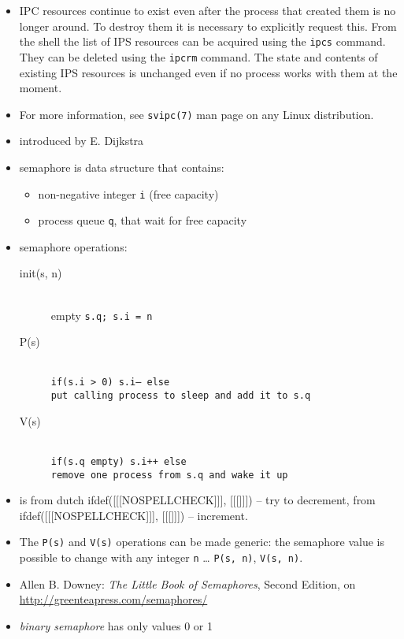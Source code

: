 \begin{itemize}
\item IPC resources continue to exist even after the process that created them
is no longer around. To destroy them it is necessary to explicitly request this.
From the shell the list of IPS resources can be acquired using
the \texttt{ipcs} command. They can be deleted using the \texttt{ipcrm} command.
The state and contents of existing IPS resources is unchanged even if no process
works with them at the moment.
\item For more information, see \texttt{svipc(7)} man page on any Linux
distribution.
\end{itemize}


\begin{slide}
\begin{itemize}
\item introduced by E. Dijkstra
\item semaphore is data structure that contains:
    \begin{itemize}
    \item non-negative integer \texttt{i} (free capacity)
    \item process queue \texttt{q}, that wait for free capacity
    \end{itemize}
\item semaphore operations:
    \begin{description}
    \item [init(s, n)]~\\
    empty \texttt{s.q; s.i = n}
    \item [P(s)]~\\
    \texttt{if(s.i > 0) s.i-- else\\
    put calling process to sleep and add it to s.q }
    \item [V(s)]~\\
    \texttt{if(s.q empty) s.i++ else\\
    remove one process from s.q and wake it up}
    \end{description}
\end{itemize}
\end{slide}

\begin{itemize}
\item {} is from dutch ifdef([[[NOSPELLCHECK]]],
[[[]]]) -- try to
decrement,  from ifdef([[[NOSPELLCHECK]]], [[[]]])
-- increment.
\item The \texttt{P(s)} and \texttt{V(s)} operations can be made generic:
the semaphore value is possible to change with any integer
\texttt{n} \dots{} \texttt{P(s,~n)}, \texttt{V(s,~n)}.
\item Allen B. Downey: \emph{The Little Book of Semaphores}, Second Edition,
on \url{http://greenteapress.com/semaphores/}
\item \emph{binary semaphore} has only values 0 or 1
\end{itemize}

